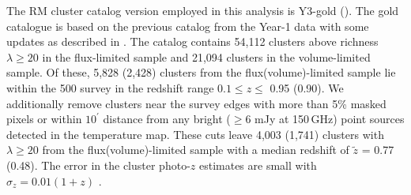 The RM cluster catalog version employed in this analysis is Y3-gold (\whichcatversion). 
The \whichyear{} gold catalogue is based on the previous catalog from the Year-1 data \citep{drlica-wagner17} with some updates as described in \citet{morganson18}.
The catalog contains 54,112 clusters above richness $\lambda \ge 20$ in the flux-limited sample and 21,094 clusters in the volume-limited sample. %
Of these, 5,828 (2,428) clusters from the flux(volume)-limited sample lie within the \sptpol{} 500 \sqdeg{} survey  in the redshift range $0.1 \le z \le$ 0.95 (0.90). 
We additionally remove clusters near the survey edges with more than 5\% masked pixels or within $10^{\prime}$ distance from any bright ($\ge 6$ mJy at 150\,GHz) point sources detected in the \sptpol{} temperature map.
These cuts leave 4,003 (1,741) clusters with $\lambda \ge 20$ from the flux(volume)-limited sample with a median redshift of $\tilde{z}$ = 0.77 (0.48). 
The error in the cluster photo-$z$ estimates are small with $\hat{\sigma}_{z} = 0.01 (1+z)$ \citep{rozo15}.

